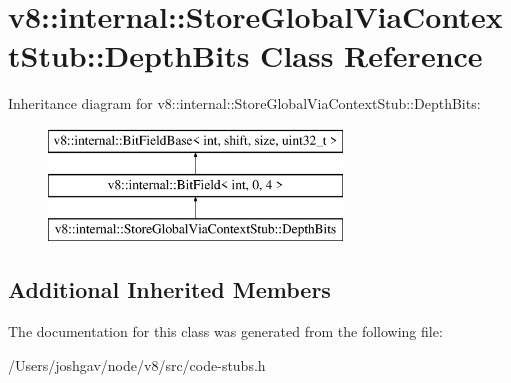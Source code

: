 \hypertarget{classv8_1_1internal_1_1_store_global_via_context_stub_1_1_depth_bits}{}\section{v8\+:\+:internal\+:\+:Store\+Global\+Via\+Context\+Stub\+:\+:Depth\+Bits Class Reference}
\label{classv8_1_1internal_1_1_store_global_via_context_stub_1_1_depth_bits}
Inheritance diagram for v8\+:\+:internal\+:\+:Store\+Global\+Via\+Context\+Stub\+:\+:Depth\+Bits\+:\begin{figure}[H]
\begin{center}
\leavevmode
\includegraphics[height=3.000000cm]{classv8_1_1internal_1_1_store_global_via_context_stub_1_1_depth_bits}
\end{center}
\end{figure}
\subsection*{Additional Inherited Members}


The documentation for this class was generated from the following file\+:\begin{DoxyCompactItemize}
\item 
/\+Users/joshgav/node/v8/src/code-\/stubs.\+h\end{DoxyCompactItemize}
